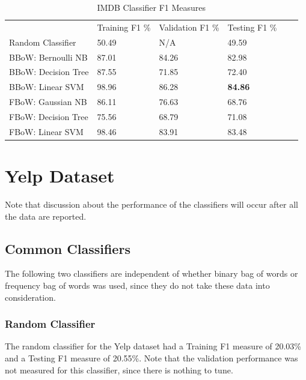 \documentclass[11pt]{article}
\begin{document}
\begin{table}[ht]
\centering
\caption{IMDB Classifier F1 Measures}
\label{my-label}
\begin{tabular}{llllll}
                                         & Training F1 \%             & Validation F1 \%           & Testing F1 \% &  &  \\ \cline{1-4}
\multicolumn{1}{l|}{Random Classifier}   & \multicolumn{1}{l|}{50.49} & \multicolumn{1}{l|}{N/A}   & 49.59         &  &  \\
\multicolumn{1}{l|}{BBoW: Bernoulli NB}  & \multicolumn{1}{l|}{87.01} & \multicolumn{1}{l|}{84.26} & 82.98         &  &  \\
\multicolumn{1}{l|}{BBoW: Decision Tree} & \multicolumn{1}{l|}{87.55} & \multicolumn{1}{l|}{71.85} & 72.40         &  &  \\
\multicolumn{1}{l|}{BBoW: Linear SVM}    & \multicolumn{1}{l|}{98.96} & \multicolumn{1}{l|}{86.28} & \textbf{84.86}         &  &  \\
\multicolumn{1}{l|}{FBoW: Gaussian NB}   & \multicolumn{1}{l|}{86.11} & \multicolumn{1}{l|}{76.63} & 68.76         &  &  \\
\multicolumn{1}{l|}{FBoW: Decision Tree} & \multicolumn{1}{l|}{75.56} & \multicolumn{1}{l|}{68.79} & 71.08         &  &  \\
\multicolumn{1}{l|}{FBoW: Linear SVM}    & \multicolumn{1}{l|}{98.46} & \multicolumn{1}{l|}{83.91} & 83.48         &  & 
\end{tabular}
\end{table}
\section{Yelp Dataset}
Note that discussion about the performance of the classifiers will occur after all the data are reported.
\subsection{Common Classifiers}
The following two classifiers are independent of whether binary bag of words or frequency bag of words was used, since they do not take these data into consideration.

\subsubsection{Random Classifier}
The random classifier for the Yelp dataset had a Training F1 measure of 20.03\% and a Testing F1 measure of 20.55\%. Note that the validation performance was not measured for this classifier, since there is nothing to tune.
\end{document}
